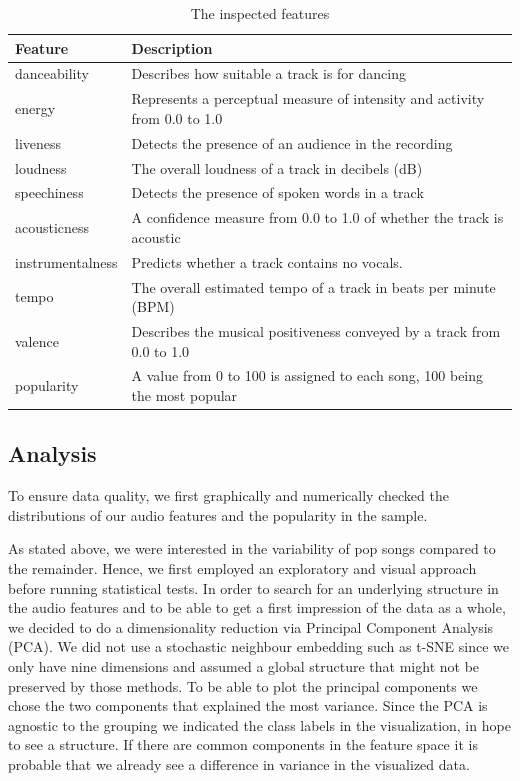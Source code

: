 \documentclass{article}
\begin{document}
\begin{table}[t]
  \centering
  \begin{tabular}{ll}
    \toprule
    Feature     & Description\\
    \midrule
	danceability        	& Describes how suitable a track is for dancing  \\
	energy              	&  Represents a perceptual measure of intensity and activity from 0.0 to 1.0\\
	liveness            	&  Detects the presence of an audience in the recording\\
	loudness            	&  The overall loudness of a track in decibels (dB)\\
	speechiness         	&  Detects the presence of spoken words in a track\\
	acousticness        	& A confidence measure from 0.0 to 1.0 of whether the track is acoustic	\\
	instrumentalness    	&	Predicts whether a track contains no vocals. \\
	tempo               	&  The overall estimated tempo of a track in beats per minute (BPM)\\
	valence             	& Describes the musical positiveness conveyed by a track from 0.0 to 1.0\\
	\midrule
	popularity           &  A value from 0 to 100 is assigned to each song, 100 being the most popular\\
    \bottomrule
  \end{tabular}
  \vspace*{2mm}
  \caption{The inspected features}
  \label{tab:features}
\end{table}


\subsection{Analysis}
To ensure data quality, we first graphically and numerically checked the distributions of our audio features and the popularity in the sample.

As stated above, we were interested in the variability of pop songs compared to the remainder. Hence, we first employed an exploratory and visual approach before running statistical tests. In order to search for an underlying structure in the audio features and to be able to get a first impression of the data as a whole, we decided to do a dimensionality reduction via Principal Component Analysis (PCA). We did not use a stochastic neighbour embedding such as t-SNE since we only have nine dimensions and assumed a global structure that might not be preserved by those methods. To be able to plot the principal components we chose the two components that explained the most variance. Since the PCA is agnostic to the grouping we indicated the class labels in the visualization, in hope to see a structure. If there are common components in the feature space it is probable that we already see a difference in variance in the visualized data.
\end{document}
